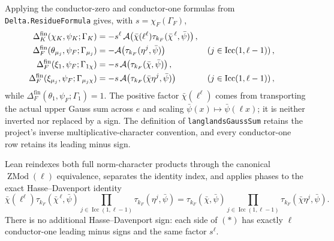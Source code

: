 \begin{theorem}
Applying the conductor-zero and conductor-one formulas from
\texttt{Delta.ResidueFormula} gives, with
$s=\chi_F(\Gamma_F)$,
\begin{align*}
 \Delta_K^{\mathrm{fin}}(\chi_K,\psi_K;\Gamma_K)
  &=-s^\ell\,
    \mathcal A\!\left(
      \bar\chi(\ell^\ell)
      \tau_{k_F}(\bar\chi^{\,\ell},\bar\psi)\right),\\
 \Delta_F^{\mathrm{fin}}(\theta_{\mu_j},\psi_F;\Gamma_{\mu_j})
  &=-\mathcal A\!\left(\tau_{k_F}(\eta^j,\bar\psi)\right)
       &&\left(j\in\operatorname{Icc}(1,\ell-1)\right),\\
 \Delta_F^{\mathrm{fin}}(\xi_1,\psi_F;\Gamma_{1\chi})
  &=-s\,\mathcal A\!\left(\tau_{k_F}(\bar\chi,\bar\psi)\right),\\
 \Delta_F^{\mathrm{fin}}(\xi_{\mu_j},\psi_F;\Gamma_{\mu_j\chi})
  &=-s\,\mathcal A\!\left(
      \tau_{k_F}(\bar\chi\eta^j,\bar\psi)\right)
       &&\left(j\in\operatorname{Icc}(1,\ell-1)\right),
\end{align*}
while
$\Delta_F^{\mathrm{fin}}(\theta_1,\psi_F;\Gamma_1)=1$.
The positive factor $\bar\chi(\ell^\ell)$ comes from transporting the
actual upper Gauss sum across $e$ and scaling
$\bar\psi(x)\mapsto\bar\psi(\ell x)$; it is neither inverted nor replaced
by a sign.  The definition of \texttt{langlandsGaussSum} retains the
project's inverse multiplicative-character convention, and every
conductor-one row retains its leading minus sign.

Lean reindexes both full norm-character products through the canonical
$\operatorname{ZMod}(\ell)$ equivalence, separates the identity index, and
applies phases to the exact Hasse--Davenport identity
\[
 \bar\chi(\ell^\ell)
 \tau_{k_F}(\bar\chi^{\,\ell},\bar\psi)
 \prod_{j\in\operatorname{Icc}(1,\ell-1)}
   \tau_{k_F}(\eta^j,\bar\psi)
 =
 \tau_{k_F}(\bar\chi,\bar\psi)
 \prod_{j\in\operatorname{Icc}(1,\ell-1)}
   \tau_{k_F}(\bar\chi\eta^j,\bar\psi).
\]
There is no additional Hasse--Davenport sign: each side of $(*)$ has
exactly $\ell$ conductor-one leading minus signs and the same factor
$s^\ell$.


\end{theorem}
